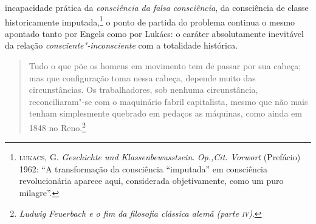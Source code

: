 incapacidade prática da \emph{consciência da falsa consciência}, da
consciência de classe historicamente imputada,\footnote{\textsc{lukacs},
  G. \emph{Geschichte und Klassenbewusstsein}. \emph{Op.,Cit. Vorwort}
  (Prefácio) 1962: ``A transformação da consciência ``imputada'' em
  consciência revolucionária aparece aqui, considerada objetivamente,
  como um puro milagre''.} o ponto de partida do problema continua o
mesmo apontado tanto por Engels como por Lukács: o caráter absolutamente
inevitável da relação \emph{consciente"-inconsciente} com a totalidade
histórica.

\begin{quote}
Tudo o que põe os homens em movimento tem de passar por sua cabeça; mas
que configuração toma nessa cabeça, depende muito das circunstâncias. Os
trabalhadores, sob nenhuma circunstância, reconciliaram"-se com o
maquinário fabril capitalista, mesmo que não mais tenham simplesmente
quebrado em pedaços as máquinas, como ainda em 1848 no Reno.\footnote{\emph{Ludwig Feuerbach e o fim da filosofia clássica alemã (parte \textsc{iv})}.}
\end{quote}

